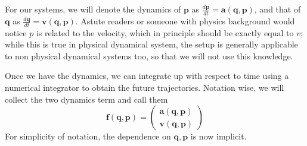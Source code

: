 \documentclass{statsmsc}
\begin{document}
For our systems, we will denote the dynamics of $\mathbf{p}$ as $\frac{d\mathbf{p}}{dt}=\mathbf{a}(\mathbf{q}, \mathbf{p})$, and that of $\mathbf{q}$ as $\frac{d\mathbf{q}}{dt}=\mathbf{v}(\mathbf{q}, \mathbf{p})$.
Astute readers or someone with physics background would notice $p$ is related to the velocity, which in principle should be exactly equal to $v$; while this is true in physical dynamical system, the setup is generally applicable to non physical dynamical systems too, so that we will not use this knowledge. 

Once we have the dynamics, we can integrate up with respect to time using a numerical integrator to obtain the future trajectories. 
Notation wise, we will collect the two dynamics term and call them $$\mathbf{f(\mathbf{q}, \mathbf{p})}=\begin{pmatrix}
    \mathbf{a(\mathbf{q}, \mathbf{p})}\\\mathbf{v(\mathbf{q}, \mathbf{p})}
\end{pmatrix}$$
For simplicity of notation, the dependence on $\mathbf{q}, \mathbf{p}$ is now implicit. 
\end{document}
